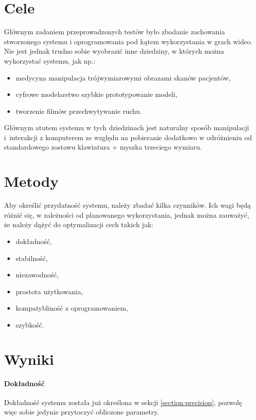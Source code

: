 \label{ch:tests}

\section{Cele}

Głównym zadaniem przeprowadzonych testów było zbadanie zachowania stworzonego systemu i oprogramowania pod kątem wykorzystania w grach wideo. Nie jest jednak trudno sobie wyobrazić inne dziedziny, w których można wykorzystać systemu, jak np.:
\begin{itemize}
 \item medycyna \ppauza manipulacja trójwymiarowymi obrazami skanów pacjentów,
 \item cyfrowe modelarstwo \ppauza szybkie prototypowanie modeli,
 \item tworzenie filmów \ppauza przechwytywanie ruchu.
\end{itemize}

Głównym atutem systemu w tych dziedzinach jest naturalny sposób manipulacji i~interakcji z komputerem ze względu na pobieranie dodatkowo \ppauza w odróżnieniu od standardowego zostawu klawiatura + myszka \ppauza trzeciego wymiaru.

\section{Metody}
Aby określić przydatność systemu, należy zbadać kilka czynników. Ich wagi będą różnić się, w zależności od planowanego wykorzystania, jednak można zauważyć, że należy dążyć do optymalizacji cech takich jak:
\begin{itemize}
 \item dokładność,
 \item stabilność,
 \item niezawodność,
 \item prostota użytkowania,
 \item kompatybliność z oprogramowaniem,
 \item szybkość.
\end{itemize}


\section{Wyniki}
\paragraph{Dokładność}
Dokładność systemu została już określona w sekcji \ref{section:precision}, pozwolę więc sobie jedynie przytoczyć obliczone parametry.

